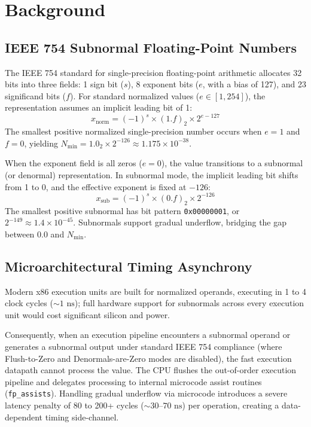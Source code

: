 \section{Background}
\label{sec:background}

\subsection{IEEE 754 Subnormal Floating-Point Numbers}
The IEEE 754 standard for single-precision floating-point arithmetic allocates 32 bits into three fields: 1 sign bit ($s$), 8 exponent bits ($e$, with a bias of 127), and 23 significand bits ($f$). For standard normalized values ($e \in [1, 254]$), the representation assumes an implicit leading bit of 1:
\begin{equation}
x_{\text{norm}} = (-1)^s \times (1.f)_2 \times 2^{e - 127}
\end{equation}
The smallest positive normalized single-precision number occurs when $e = 1$ and $f = 0$, yielding $N_{\text{min}} = 1.0_2 \times 2^{-126} \approx 1.175 \times 10^{-38}$.

When the exponent field is all zeros ($e = 0$), the value transitions to a subnormal (or denormal) representation. In subnormal mode, the implicit leading bit shifts from 1 to 0, and the effective exponent is fixed at $-126$:
\begin{equation}
x_{\text{sub}} = (-1)^s \times (0.f)_2 \times 2^{-126}
\end{equation}
The smallest positive subnormal has bit pattern \texttt{0x00000001}, or $2^{-149} \approx 1.4 \times 10^{-45}$. Subnormals support gradual underflow, bridging the gap between $0.0$ and $N_{\text{min}}$.

\subsection{Microarchitectural Timing Asynchrony}
Modern x86 execution units are built for normalized operands, executing in 1 to 4 clock cycles ($\sim 1\text{ ns}$); full hardware support for subnormals across every execution unit would cost significant silicon and power.

Consequently, when an execution pipeline encounters a subnormal operand or generates a subnormal output under standard IEEE 754 compliance (where Flush-to-Zero and Denormals-are-Zero modes are disabled), the fast execution datapath cannot process the value. The CPU flushes the out-of-order execution pipeline and delegates processing to internal microcode assist routines (\texttt{fp\_assists}). Handling gradual underflow via microcode introduces a severe latency penalty of 80 to 200+ cycles ($\sim 30\text{--}70\text{ ns}$) per operation, creating a data-dependent timing side-channel.

